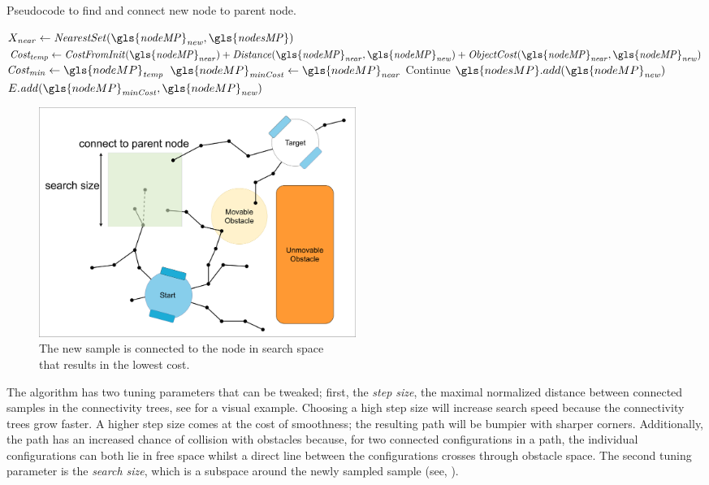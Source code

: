 \begin{algorithm}[H]
\caption{Pseudocode to find and connect new node to parent node.}%
\label{pseudocode:proposed_rrt_star_two}
\begin{algorithmic}[1]
\hspace{-0.9cm}\colorbox{my_yellow}{\parbox{\linewidth}{%
    \State $X_\mathit{near} \leftarrow \mathit{NearestSet(\gls{nodeMP}_{new}, \gls{nodesMP})}$ 
    \State $\mathit{Cost_{temp}} \leftarrow \mathit{CostFromInit(\gls{nodeMP}_{near}) + Distance(\gls{nodeMP}_{near}, \gls{nodeMP}_{new}) + ObjectCost(\gls{nodeMP}_{near}, \gls{nodeMP}_{new})}$
    \State $\mathit{Cost_{min}} \leftarrow \gls{nodeMP}_\mathit{temp}$
    \State $\gls{nodeMP}_\mathit{minCost} \leftarrow \gls{nodeMP}_\mathit{near}$
            \EndIf
        \EndIf
    \EndFor
        \State Continue
    \Else
    \State $\gls{nodesMP}.add(\gls{nodeMP}_\mathit{new})$
    \State $E.\mathit{add}(\gls{nodeMP}_\mathit{minCost}, \gls{nodeMP}_\mathit{new})$
    \EndIf
}}
\end{algorithmic}
\end{algorithm}

\begin{figure}[H]
    \centering
    \includegraphics[width=0.5\textwidth, cfbox=my_yellow 5pt 0pt]{figures/required_background/mp/4mp_connect_to_tree.drawio.png}
    \caption{The new sample is connected to the node in search space\\that results in the lowest cost.}%
    \label{fig:motion_planner_adding_one_sample_two}
\end{figure}


The algorithm has two tuning parameters that can be tweaked; first, the \textit{step size}, the maximal normalized distance between connected samples in the connectivity trees, see  for a visual example. Choosing a high step size will increase search speed because the connectivity trees grow faster. A higher step size comes at the cost of smoothness; the resulting path will be bumpier with sharper corners. Additionally, the path has an increased chance of collision with obstacles because, for two connected configurations in a path, the individual configurations can both lie in free space whilst a direct line between the configurations crosses through obstacle space. The second tuning parameter is the \textit{search size}, which is a subspace around the newly sampled sample (see, ).\bs

